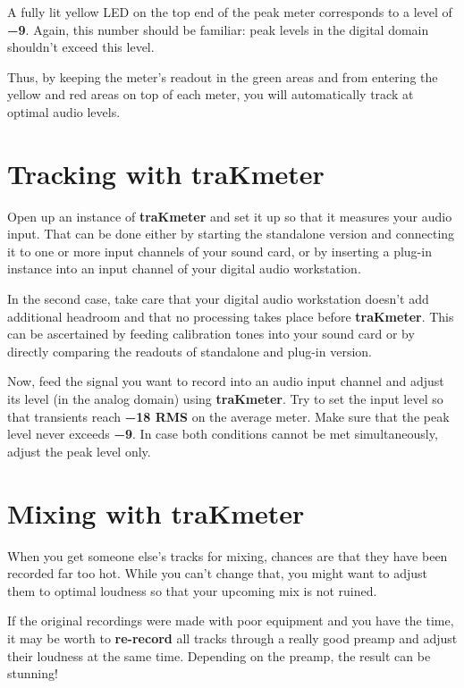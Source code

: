 A fully lit yellow LED on the top end of the peak meter corresponds to
a level of \textbf{\SI{-9}{\dBFS}}.  Again, this number should be
familiar: peak levels in the digital domain shouldn't exceed this
level.

Thus, by keeping the meter's readout in the green areas and from
entering the yellow and red areas on top of each meter, you will
automatically track at optimal audio levels.

\section{Tracking with traKmeter}
\label{sec:tracking_with_trakmeter}

Open up an instance of \textbf{traKmeter} and set it up so that it
measures your audio input.  That can be done either by starting the
standalone version and connecting it to one or more input channels of
your sound card, or by inserting a plug-in instance into an input
channel of your digital audio workstation.

In the second case, take care that your digital audio workstation
doesn't add additional headroom and that no processing takes place
before \textbf{traKmeter}.  This can be ascertained by feeding
calibration tones into your sound card or by directly comparing the
readouts of standalone and plug-in version.

Now, feed the signal you want to record into an audio input channel
and adjust its level (in the analog domain) using \textbf{traKmeter}.
Try to set the input level so that transients reach
\textbf{\SI{-18}{\dBFS} RMS} on the average meter.  Make sure that the
peak level never exceeds \textbf{\SI{-9}{\dBFS}}.  In case both
conditions cannot be met simultaneously, adjust the peak level only.

\section{Mixing with traKmeter}
\label{sec:mixing_with_trakmeter}

When you get someone else's tracks for mixing, chances are that they
have been recorded far too hot.  While you can't change that, you
might want to adjust them to optimal loudness so that your upcoming
mix is not ruined.

If the original recordings were made with poor equipment and you have
the time, it may be worth to \textbf{re-record} all tracks through a
really good preamp and adjust their loudness at the same time.
Depending on the preamp, the result can be stunning!

